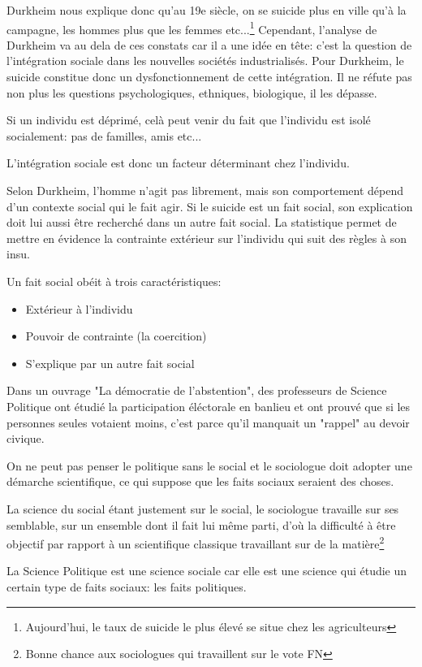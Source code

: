\documentclass[12pt, a4paper, openany]{book}
\begin{document}
Durkheim nous explique donc qu'au 19e siècle, on se suicide plus en ville qu'à la campagne, les hommes plus que les femmes etc...\footnote{Aujourd'hui, le taux de suicide le plus élevé se situe chez les agriculteurs} Cependant, l'analyse de Durkheim va au dela de ces constats car il a une idée en tête: c'est la question de l'intégration sociale dans les nouvelles sociétés industrialisés. Pour Durkheim, le suicide constitue donc un dysfonctionnement de cette intégration. Il ne réfute pas non plus les questions psychologiques, ethniques, biologique, il les dépasse.

Si un individu est déprimé, celà peut venir du fait que l'individu est isolé socialement: pas de familles, amis etc...

L'intégration sociale est donc un facteur déterminant chez l'individu.

Selon Durkheim, l'homme n'agit pas librement, mais son comportement dépend d'un contexte social qui le fait agir. Si le suicide est un fait social, son explication doit lui aussi être recherché dans un autre fait social. La statistique permet de mettre en évidence la contrainte extérieur sur l'individu qui suit des règles à son insu.

Un fait social obéit à trois caractéristiques:
\begin{itemize}
\item Extérieur à l'individu
\item Pouvoir de contrainte (la coercition)
\item S'explique par un autre fait social
\end{itemize}

Dans un ouvrage "La démocratie de l'abstention", des professeurs de Science Politique ont étudié la participation éléctorale en banlieu et ont prouvé que si les personnes seules votaient moins, c'est parce qu'il manquait un "rappel" au devoir civique. 

On ne peut pas penser le politique sans le social et le sociologue doit adopter une démarche scientifique, ce qui suppose que les faits sociaux seraient des choses.

La science du social étant justement sur le social, le sociologue travaille sur ses semblable, sur un ensemble dont il fait lui même parti, d'où la difficulté à être objectif par rapport à un scientifique classique travaillant sur de la matière\footnote{Bonne chance aux sociologues qui travaillent sur le vote FN}

La Science Politique est une science sociale car elle est une science qui étudie un certain type de faits sociaux: les faits politiques.
\end{document}
